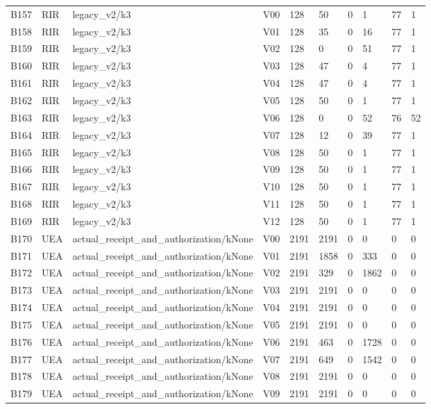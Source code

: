 \begin{longtable}{llllllllll}
B157 & RIR & legacy\_v2/k3 & V00 & 128 & 50 & 0 & 1 & 77 & 1 \\
B158 & RIR & legacy\_v2/k3 & V01 & 128 & 35 & 0 & 16 & 77 & 1 \\
B159 & RIR & legacy\_v2/k3 & V02 & 128 & 0 & 0 & 51 & 77 & 1 \\
B160 & RIR & legacy\_v2/k3 & V03 & 128 & 47 & 0 & 4 & 77 & 1 \\
B161 & RIR & legacy\_v2/k3 & V04 & 128 & 47 & 0 & 4 & 77 & 1 \\
B162 & RIR & legacy\_v2/k3 & V05 & 128 & 50 & 0 & 1 & 77 & 1 \\
B163 & RIR & legacy\_v2/k3 & V06 & 128 & 0 & 0 & 52 & 76 & 52 \\
B164 & RIR & legacy\_v2/k3 & V07 & 128 & 12 & 0 & 39 & 77 & 1 \\
B165 & RIR & legacy\_v2/k3 & V08 & 128 & 50 & 0 & 1 & 77 & 1 \\
B166 & RIR & legacy\_v2/k3 & V09 & 128 & 50 & 0 & 1 & 77 & 1 \\
B167 & RIR & legacy\_v2/k3 & V10 & 128 & 50 & 0 & 1 & 77 & 1 \\
B168 & RIR & legacy\_v2/k3 & V11 & 128 & 50 & 0 & 1 & 77 & 1 \\
B169 & RIR & legacy\_v2/k3 & V12 & 128 & 50 & 0 & 1 & 77 & 1 \\
B170 & UEA & actual\_receipt\_and\_authorization/kNone & V00 & 2191 & 2191 & 0 & 0 & 0 & 0 \\
B171 & UEA & actual\_receipt\_and\_authorization/kNone & V01 & 2191 & 1858 & 0 & 333 & 0 & 0 \\
B172 & UEA & actual\_receipt\_and\_authorization/kNone & V02 & 2191 & 329 & 0 & 1862 & 0 & 0 \\
B173 & UEA & actual\_receipt\_and\_authorization/kNone & V03 & 2191 & 2191 & 0 & 0 & 0 & 0 \\
B174 & UEA & actual\_receipt\_and\_authorization/kNone & V04 & 2191 & 2191 & 0 & 0 & 0 & 0 \\
B175 & UEA & actual\_receipt\_and\_authorization/kNone & V05 & 2191 & 2191 & 0 & 0 & 0 & 0 \\
B176 & UEA & actual\_receipt\_and\_authorization/kNone & V06 & 2191 & 463 & 0 & 1728 & 0 & 0 \\
B177 & UEA & actual\_receipt\_and\_authorization/kNone & V07 & 2191 & 649 & 0 & 1542 & 0 & 0 \\
B178 & UEA & actual\_receipt\_and\_authorization/kNone & V08 & 2191 & 2191 & 0 & 0 & 0 & 0 \\
B179 & UEA & actual\_receipt\_and\_authorization/kNone & V09 & 2191 & 2191 & 0 & 0 & 0 & 0 \\

\end{longtable}
